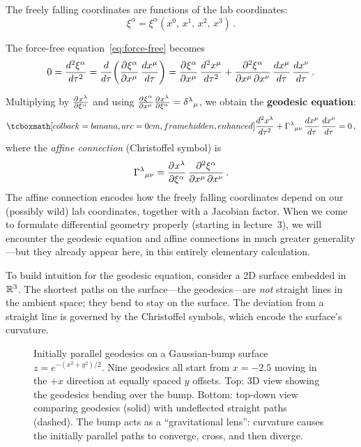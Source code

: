 The freely falling coordinates are functions of the lab coordinates:
\[
  \xi^\alpha = \xi^\alpha(x^0,\,x^1,\,x^2,\,x^3)\,.
\]

The force-free equation~\eqref{eq:force-free} becomes
\begin{equation}
  0 = \frac{d^2\xi^\alpha}{d\tau^2}
    = \frac{d}{d\tau}\!\left(
        \frac{\partial^{} \xi^\alpha}{\partial {x^\mu}^{}}\,\frac{dx^\mu}{d\tau}
      \right)
    = \frac{\partial^{} \xi^\alpha}{\partial {x^\mu}^{}}\,\frac{d^2 x^\mu}{d\tau^2}
      + \frac{\partial^2\xi^\alpha}{\partial x^\mu\,\partial x^\nu}\,
        \frac{dx^\mu}{d\tau}\,\frac{dx^\nu}{d\tau}\,.
\end{equation}

Multiplying by $\frac{\partial^{} x^\lambda}{\partial {\xi^\alpha}^{}}$ and using
$\frac{\partial^{} \xi^\alpha}{\partial {x^\mu}^{}}\frac{\partial^{} x^\lambda}{\partial {\xi^\alpha}^{}} = \delta^\lambda{}_\mu$,
we obtain the \textbf{geodesic equation}:
\begin{equation}\label{eq:geodesic}
  \eqbox{
    \frac{d^2 x^\lambda}{d\tau^2}
    + \chris{\lambda}{\mu\nu}\,
      \frac{dx^\mu}{d\tau}\,\frac{dx^\nu}{d\tau}
    = 0}\,,
\end{equation}
where the \emph{affine connection} (Christoffel symbol) is
\begin{equation}\label{eq:christoffel-def}
  \Gamma^{\lambda}{}_{\mu\nu}
    = \frac{\partial^{} x^\lambda}{\partial {\xi^\alpha}^{}}\,
      \frac{\partial^2\xi^\alpha}{\partial x^\mu\,\partial x^\nu}\,.
\end{equation}
The affine connection encodes how the freely falling coordinates
depend on our (possibly wild) lab coordinates, together with a
Jacobian factor.  When we come to formulate differential geometry
properly (starting in lecture~3), we will encounter the geodesic
equation and affine connections in much greater generality---but
they already appear here, in this entirely elementary calculation.

\begin{intuition}
  To build intuition for the geodesic equation, consider a 2D
  surface embedded in~$\mathbb{R}^{3}$.  The shortest paths on the
  surface---the geodesics---are \emph{not} straight lines in
  the ambient space; they bend to stay on the surface.
  The deviation from a straight line is governed by the
  Christoffel symbols, which encode the surface's curvature.
\end{intuition}

\begin{figure}[htbp]
  \centering
  
  \caption{Initially parallel geodesics on a Gaussian-bump
    surface $z = e^{-(x^2+y^2)/2}$.  Nine geodesics all start from
    $x = -2.5$ moving in the $+x$ direction at equally spaced $y$
    offsets.  Top: 3D view showing the geodesics bending over the
    bump.  Bottom: top-down view comparing geodesics (solid) with
    undeflected straight paths (dashed).  The bump acts as a
    ``gravitational lens'': curvature causes the initially parallel
    paths to converge, cross, and then
    diverge.}\label{fig:geodesic-bump}
\end{figure}

